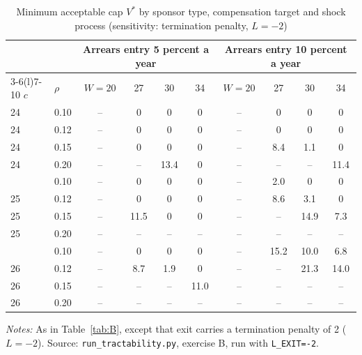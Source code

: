 \begin{table}[htbp]
\begin{threeparttable}
\end{threeparttable}\end{table}

\begin{table}[htbp]\centering\small
\caption{Minimum acceptable cap $V^*$ by sponsor type, compensation target and shock process (sensitivity: termination penalty, $L = -2$)}\label{tab:B0}
\begin{threeparttable}\begin{tabular}{llcccccccc}\toprule
 & & \multicolumn{4}{c}{Arrears entry 5 percent a year} & \multicolumn{4}{c}{Arrears entry 10 percent a year}\\\cmidrule(lr){3-6}\cmidrule(l){7-10}
$c$ & $\rho$ & $W{=}20$ & 27 & 30 & 34 & $W{=}20$ & 27 & 30 & 34\\\midrule
24 & 0.10 & -- & 0 & 0 & 0 & -- & 0 & 0 & 0\\
24 & 0.12 & -- & 0 & 0 & 0 & -- & 0 & 0 & 0\\
24 & 0.15 & -- & 0 & 0 & 0 & -- & 8.4 & 1.1 & 0\\
24 & 0.20 & -- & -- & 13.4 & 0 & -- & -- & -- & 11.4\\
\addlinespace
25 & 0.10 & -- & 0 & 0 & 0 & -- & 2.0 & 0 & 0\\
25 & 0.12 & -- & 0 & 0 & 0 & -- & 8.6 & 3.1 & 0\\
25 & 0.15 & -- & 11.5 & 0 & 0 & -- & -- & 14.9 & 7.3\\
25 & 0.20 & -- & -- & -- & -- & -- & -- & -- & --\\
\addlinespace
26 & 0.10 & -- & 0 & 0 & 0 & -- & 15.2 & 10.0 & 6.8\\
26 & 0.12 & -- & 8.7 & 1.9 & 0 & -- & -- & 21.3 & 14.0\\
26 & 0.15 & -- & -- & -- & 11.0 & -- & -- & -- & --\\
26 & 0.20 & -- & -- & -- & -- & -- & -- & -- & --\\
\bottomrule\end{tabular}
\begin{tablenotes}\footnotesize\item \textit{Notes:} As in Table~\ref{tab:B}, except that exit carries a termination penalty of 2 ($L = -2$). Source: \texttt{run\_tractability.py}, exercise B, run with \texttt{L\_EXIT=-2}.\end{tablenotes}
\end{threeparttable}\end{table}